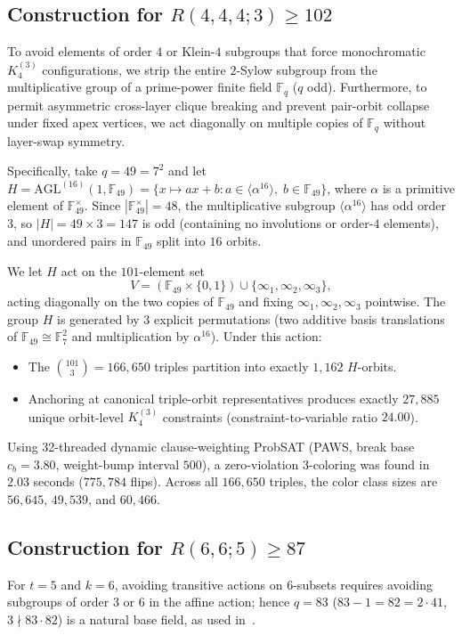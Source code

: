 \documentclass[11pt,a4paper]{article}
\begin{document}
\subsection{Construction for $R(4,4,4;3) \ge 102$}
To avoid elements of order $4$ or Klein-$4$ subgroups that force monochromatic $K_4^{(3)}$ configurations, we strip the entire $2$-Sylow subgroup from the multiplicative group of a prime-power finite field $\mathbb{F}_q$ ($q$ odd). Furthermore, to permit asymmetric cross-layer clique breaking and prevent pair-orbit collapse under fixed apex vertices, we act diagonally on multiple copies of $\mathbb{F}_q$ without layer-swap symmetry.

Specifically, take $q = 49 = 7^2$ and let $H = \mathrm{AGL}^{(16)}(1, \mathbb{F}_{49}) = \{x \mapsto a x + b : a \in \langle \alpha^{16} \rangle,\; b \in \mathbb{F}_{49}\}$, where $\alpha$ is a primitive element of $\mathbb{F}_{49}^\times$. Since $|\mathbb{F}_{49}^\times| = 48$, the multiplicative subgroup $\langle \alpha^{16} \rangle$ has odd order $3$, so $|H| = 49 \times 3 = 147$ is odd (containing no involutions or order-$4$ elements), and unordered pairs in $\mathbb{F}_{49}$ split into $16$ orbits.

We let $H$ act on the $101$-element set
\[
V = (\mathbb{F}_{49} \times \{0, 1\}) \cup \{\infty_1, \infty_2, \infty_3\},
\]
acting diagonally on the two copies of $\mathbb{F}_{49}$ and fixing $\infty_1, \infty_2, \infty_3$ pointwise. The group $H$ is generated by $3$ explicit permutations (two additive basis translations of $\mathbb{F}_{49} \cong \mathbb{F}_7^2$ and multiplication by $\alpha^{16}$). Under this action:
\begin{itemize}
    \item The $\binom{101}{3} = 166{,}650$ triples partition into exactly $1{,}162$ $H$-orbits.
    \item Anchoring at canonical triple-orbit representatives produces exactly $27{,}885$ unique orbit-level $K_4^{(3)}$ constraints (constraint-to-variable ratio $24.00$).
\end{itemize}
Using 32-threaded dynamic clause-weighting ProbSAT (PAWS, break base $c_b = 3.80$, weight-bump interval $500$), a zero-violation $3$-coloring was found in $2.03$ seconds ($775{,}784$ flips). Across all $166{,}650$ triples, the color class sizes are $56{,}645$, $49{,}539$, and $60{,}466$.

\subsection{Construction for $R(6,6;5) \ge 87$}
For $t=5$ and $k=6$, avoiding transitive actions on $6$-subsets requires avoiding subgroups of order $3$ or $6$ in the affine action; hence $q = 83$ ($83 - 1 = 82 = 2 \cdot 41$, $3 \nmid 83 \cdot 82$) is a natural base field, as used in~\cite{Lysenstoen2026}.
\end{document}
